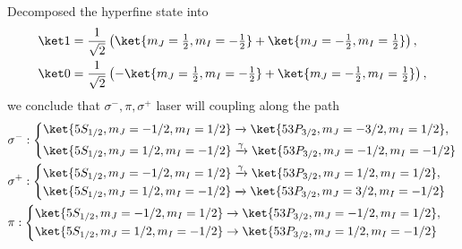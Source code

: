 Decomposed the hyperfine state into
\begin{align}
\ket1
&=\frac{1}{\sqrt2}
\left(
\ket{m_J=\tfrac12,m_I=-\tfrac12}
+\ket{m_J=-\tfrac12,m_I=\tfrac12}
\right),\\
\ket0
&=\frac{1}{\sqrt2}
\left(
-\ket{m_J=\tfrac12,m_I=-\tfrac12}
+\ket{m_J=-\tfrac12,m_I=\tfrac12}
\right),
\end{align}
we conclude that $\sigma^-, \pi, \sigma^+$ laser will coupling along the path
\begin{align}
&\sigma^-:
\left\{
\begin{aligned}
&\ket{5S_{1/2},m_J=-1/2, m_I=1/2} \xrightarrow{} \ket{53P_{3/2},m_J=-3/2, m_I=1/2},\\
&\ket{5S_{1/2},m_J=1/2, m_I=-1/2}  \xrightarrow{\gamma} \ket{53P_{3/2},m_J=-1/2, m_I=-1/2}
\end{aligned}
\right. \\
&\sigma^+:
\left\{
\begin{aligned}
&\ket{5S_{1/2},m_J=-1/2, m_I=1/2} \xrightarrow{\gamma} \ket{53P_{3/2},m_J=1/2, m_I=1/2},\\
&\ket{5S_{1/2},m_J=1/2, m_I=-1/2} \xrightarrow{} \ket{53P_{3/2},m_J=3/2, m_I=-1/2}
\end{aligned}
\right.\\
&\pi:
\left\{
\begin{aligned}
&\ket{5S_{1/2},m_J=-1/2, m_I=1/2} \to \ket{53P_{3/2},m_J=-1/2, m_I=1/2},\\
&\ket{5S_{1/2},m_J=1/2, m_I=-1/2} \to \ket{53P_{3/2},m_J=1/2, m_I=-1/2}
\end{aligned}
\right.
\end{align}

